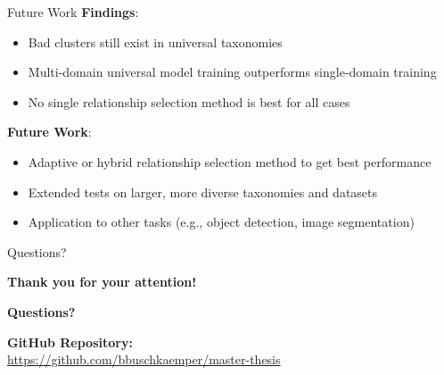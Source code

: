 \documentclass[aspectratio=169]{beamer}
\begin{document}
\begin{frame}{Future Work}
    \textbf{Findings}:
    \begin{itemize}
        \item Bad clusters still exist in universal taxonomies
        \item Multi-domain universal model training outperforms single-domain training
        \item No single relationship selection method is best for all cases
    \end{itemize}

    \vspace{1em}

    \textbf{Future Work}:
    \begin{itemize}
        \item Adaptive or hybrid relationship selection method to get best performance
        \item Extended tests on larger, more diverse taxonomies and datasets
        \item Application to other tasks (e.g., object detection, image segmentation)
    \end{itemize}
\end{frame}

\begin{frame}{Questions?}
    \begin{center}
        \textbf{\Large Thank you for your attention!}

        \vspace{1em}

        \textbf{Questions?}

        \vspace{2em}

        \textbf{GitHub Repository:}\\
        \url{https://github.com/bbuschkaemper/master-thesis}
    \end{center}
\end{frame}
\end{document}
